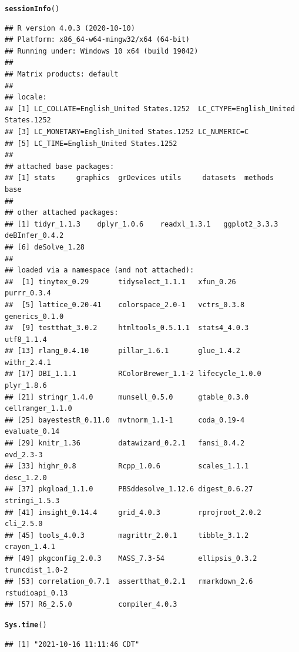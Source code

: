 \documentclass{article}\usepackage[]{graphicx}\usepackage[]{color}
\makeatletter
\newcommand{\hlstd}[1]{\textcolor[rgb]{0.345,0.345,0.345}{#1}}%
\newcommand{\hlkwd}[1]{\textcolor[rgb]{0.737,0.353,0.396}{\textbf{#1}}}%
\newenvironment{kframe}{%
 \def\at@end@of@kframe{}%
 \ifinner\ifhmode%
  \def\at@end@of@kframe{\end{minipage}}%
  \begin{minipage}{\columnwidth}%
 \fi\fi%
 \def\FrameCommand##1{\hskip\@totalleftmargin \hskip-\fboxsep
 \colorbox{shadecolor}{##1}\hskip-\fboxsep
     \hskip-\linewidth \hskip-\@totalleftmargin \hskip\columnwidth}%
 \MakeFramed {\advance\hsize-\width
   \@totalleftmargin\z@ \linewidth\hsize
   \@setminipage}}%
 {\par\unskip\endMakeFramed%
 \at@end@of@kframe}
\newenvironment{knitrout}{}{} %
\makeatother
\begin{document}
\begin{knitrout}
\color{fgcolor}\begin{kframe}
\begin{alltt}
\hlkwd{sessionInfo}\hlstd{()}
\end{alltt}
\begin{verbatim}
## R version 4.0.3 (2020-10-10)
## Platform: x86_64-w64-mingw32/x64 (64-bit)
## Running under: Windows 10 x64 (build 19042)
## 
## Matrix products: default
## 
## locale:
## [1] LC_COLLATE=English_United States.1252  LC_CTYPE=English_United States.1252   
## [3] LC_MONETARY=English_United States.1252 LC_NUMERIC=C                          
## [5] LC_TIME=English_United States.1252    
## 
## attached base packages:
## [1] stats     graphics  grDevices utils     datasets  methods   base     
## 
## other attached packages:
## [1] tidyr_1.1.3    dplyr_1.0.6    readxl_1.3.1   ggplot2_3.3.3  deBInfer_0.4.2
## [6] deSolve_1.28  
## 
## loaded via a namespace (and not attached):
##  [1] tinytex_0.29       tidyselect_1.1.1   xfun_0.26          purrr_0.3.4       
##  [5] lattice_0.20-41    colorspace_2.0-1   vctrs_0.3.8        generics_0.1.0    
##  [9] testthat_3.0.2     htmltools_0.5.1.1  stats4_4.0.3       utf8_1.1.4        
## [13] rlang_0.4.10       pillar_1.6.1       glue_1.4.2         withr_2.4.1       
## [17] DBI_1.1.1          RColorBrewer_1.1-2 lifecycle_1.0.0    plyr_1.8.6        
## [21] stringr_1.4.0      munsell_0.5.0      gtable_0.3.0       cellranger_1.1.0  
## [25] bayestestR_0.11.0  mvtnorm_1.1-1      coda_0.19-4        evaluate_0.14     
## [29] knitr_1.36         datawizard_0.2.1   fansi_0.4.2        evd_2.3-3         
## [33] highr_0.8          Rcpp_1.0.6         scales_1.1.1       desc_1.2.0        
## [37] pkgload_1.1.0      PBSddesolve_1.12.6 digest_0.6.27      stringi_1.5.3     
## [41] insight_0.14.4     grid_4.0.3         rprojroot_2.0.2    cli_2.5.0         
## [45] tools_4.0.3        magrittr_2.0.1     tibble_3.1.2       crayon_1.4.1      
## [49] pkgconfig_2.0.3    MASS_7.3-54        ellipsis_0.3.2     truncdist_1.0-2   
## [53] correlation_0.7.1  assertthat_0.2.1   rmarkdown_2.6      rstudioapi_0.13   
## [57] R6_2.5.0           compiler_4.0.3
\end{verbatim}
\begin{alltt}
\hlkwd{Sys.time}\hlstd{()}
\end{alltt}
\begin{verbatim}
## [1] "2021-10-16 11:11:46 CDT"
\end{verbatim}
\end{kframe}
\end{knitrout}
\end{document}

